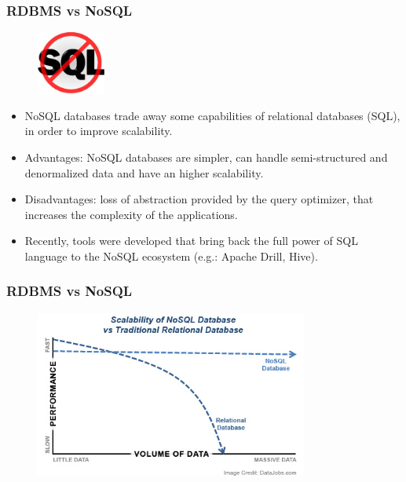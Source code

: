 \documentclass[hyperref={pdfpagelabels=true}]{beamer}
\begin{document}
\begin{frame}
\frametitle{RDBMS vs NoSQL}

    \begin{figure}   
      \includegraphics[width=0.2\textwidth]{nosql.jpg}   
    \end{figure}    
    
    \begin{itemize}    
      \item<2->NoSQL databases trade away some capabilities of relational databases (SQL), in order to improve scalability.%
      \item<3->Advantages: NoSQL databases are simpler, can handle semi-structured and denormalized data and have an higher scalability.
      \item<4->Disadvantages: loss of abstraction provided by the query optimizer, that increases the complexity of the applications.%
      \item<5->Recently, tools were developed that bring back the full power of SQL language to the NoSQL ecosystem (e.g.: Apache Drill, Hive).      
      \end{itemize}
\end{frame}


\begin{frame}
\frametitle{RDBMS vs NoSQL}
    \begin{figure}   
      \includegraphics[width=0.8\textwidth]{sql_vs_nosql.jpg}   
    \end{figure}         
\end{frame}
\end{document}
